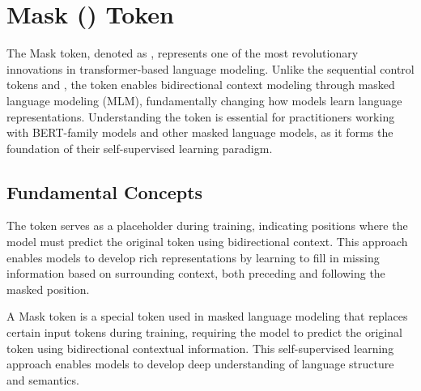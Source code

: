 
\section{Mask (\mask{}) Token}

The Mask token, denoted as \mask{}, represents one of the most revolutionary innovations in transformer-based language modeling. Unlike the sequential control tokens \sos{} and \eos{}, the \mask{} token enables bidirectional context modeling through masked language modeling (MLM), fundamentally changing how models learn language representations. Understanding the \mask{} token is essential for practitioners working with BERT-family models and other masked language models, as it forms the foundation of their self-supervised learning paradigm.

\subsection{Fundamental Concepts}

The \mask{} token serves as a placeholder during training, indicating positions where the model must predict the original token using bidirectional context. This approach enables models to develop rich representations by learning to fill in missing information based on surrounding context, both preceding and following the masked position.

\begin{definition}
A Mask token \mask{} is a special token used in masked language modeling that replaces certain input tokens during training, requiring the model to predict the original token using bidirectional contextual information. This self-supervised learning approach enables models to develop deep understanding of language structure and semantics.
\end{definition}

